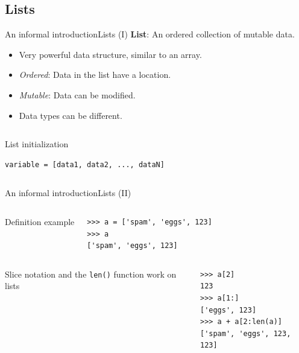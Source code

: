\documentclass[10pt,compress]{beamer} %
\begin{document}
\subsection{Lists}
\begin{frame}[fragile]{An informal introduction}{Lists (I)}
	\textbf{List}: An ordered collection of mutable data.
	\begin{itemize}
		\item Very powerful data structure, similar to an array.
		\item \textit{Ordered}: Data in the list have a location.
		\item \textit{Mutable}: Data can be modified.
		\item Data types can be different.
	\end{itemize}
	\begin{columns}
		\begin{block}{List initialization}
		\begin{verbatim}
variable = [data1, data2, ..., dataN]
\end{verbatim}
		\end{block}
	\end{columns}
\end{frame}

\begin{frame}[fragile]{An informal introduction}{Lists (II)}
	\begin{columns}
 	   	\column{.40\textwidth}
		Definition example

   		\column{.60\textwidth}
		\begin{block}{}
		\begin{verbatim}
>>> a = ['spam', 'eggs', 123]
>>> a
['spam', 'eggs', 123]
\end{verbatim}
		\end{block}
	\end{columns}

	\begin{columns}
		Slice notation and the \texttt{len()} function work on lists

		\begin{block}{}
		\begin{verbatim}
>>> a[2]
123
>>> a[1:]
['eggs', 123]
>>> a + a[2:len(a)]
['spam', 'eggs', 123, 123]
\end{verbatim}
		\end{block}
	\end{columns}
\end{frame}
\end{document}
